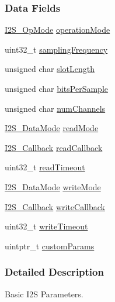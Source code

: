 \subsubsection*{Data Fields}
\begin{DoxyCompactItemize}
\item 
\hyperlink{_i2_s_8h_a1eb065ff9040979c9d6586c8d0df9ee0}{I2\+S\+\_\+\+Op\+Mode} \hyperlink{struct_i2_s___params_a4927bdc8e8cc29146f78f68ed2fed5f2}{operation\+Mode}
\item 
uint32\+\_\+t \hyperlink{struct_i2_s___params_aff5aa130ef087ebb86932182787c1df8}{sampling\+Frequency}
\item 
unsigned char \hyperlink{struct_i2_s___params_a82a7b2a0169d0104207814b069178029}{slot\+Length}
\item 
unsigned char \hyperlink{struct_i2_s___params_acbfd23bc8cd7e469cbf27d6431e43f7c}{bits\+Per\+Sample}
\item 
unsigned char \hyperlink{struct_i2_s___params_ad28849d1820321c2a5d5b4bb8dd83054}{num\+Channels}
\item 
\hyperlink{_i2_s_8h_a120b8555bc048186bbd436dbdbb5b405}{I2\+S\+\_\+\+Data\+Mode} \hyperlink{struct_i2_s___params_a52c33812ab184593d8dfe9cdb8f11f04}{read\+Mode}
\item 
\hyperlink{_i2_s_8h_af87c5d43590153717044a932ff6b2e03}{I2\+S\+\_\+\+Callback} \hyperlink{struct_i2_s___params_a94ed67cfe1320bd8daf013c132b907cc}{read\+Callback}
\item 
uint32\+\_\+t \hyperlink{struct_i2_s___params_a922986abc9bce28a05c6bc967a41a3ac}{read\+Timeout}
\item 
\hyperlink{_i2_s_8h_a120b8555bc048186bbd436dbdbb5b405}{I2\+S\+\_\+\+Data\+Mode} \hyperlink{struct_i2_s___params_a51ab14d450552a917fbadd8c91418ec5}{write\+Mode}
\item 
\hyperlink{_i2_s_8h_af87c5d43590153717044a932ff6b2e03}{I2\+S\+\_\+\+Callback} \hyperlink{struct_i2_s___params_a2cf905e275e93a49707613aedcb2ab9b}{write\+Callback}
\item 
uint32\+\_\+t \hyperlink{struct_i2_s___params_ae42c67f2e240e631a7d4944aa36e0050}{write\+Timeout}
\item 
uintptr\+\_\+t \hyperlink{struct_i2_s___params_a7fb7c5969afa79e4b6678ac84c8c8d77}{custom\+Params}
\end{DoxyCompactItemize}


\subsubsection{Detailed Description}
Basic I2\+S Parameters. 


